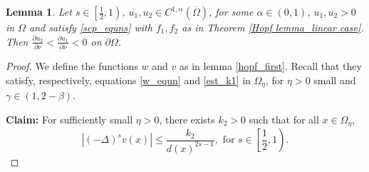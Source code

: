 \documentclass[10pt,a4paper]{amsart}
\newtheorem{lemma}[theorem]{Lemma}
\newcommand{\De}{\Delta}
\newcommand{\Om}{\Omega}
\newcommand{\ba}{\beta}
\newcommand{\pa}{\partial}
\begin{document}
\begin{lemma}\label{hopf_second}
    Let $s \in \left[\frac{1}{2}, 1\right)$, $u_1, u_2 \in C^{1,\alpha}(\overline{\Om})$, for some $\alpha\in(0,1)$, $u_1, u_2 > 0$ in $\Om$ and satisfy \eqref{scp_equns} with $f_1, f_2$ as in Theorem \ref{Hopf lemma_linear case}. Then $\frac{\pa u_2}{\pa\nu} < \frac{\pa u_1}{\pa\nu} < 0$ on $\pa\Om$.
\end{lemma}

\begin{proof}
    We define the functions $w$ and $v$ as in lemma \ref{hopf_first}. Recall that they satisfy, respectively, equations \eqref{w_equn} and \eqref{est_k1} in $\Om_{\eta}$, for $\eta>0$ small and $\gamma \in \left(1, 2- \ba\right)$.

    \noindent\textbf{Claim:} For sufficiently small $\eta>0$, there exists $k_2 >0$ such that for all $x\in \Om_{\eta}$,
    \[\left|(-\De)^s v (x)\right| \leq \frac{k_2}{d(x)^{2s-1}}, \text{ for } s\in \left[\frac{1}{2},1\right).\]


\end{proof}
\end{document}
